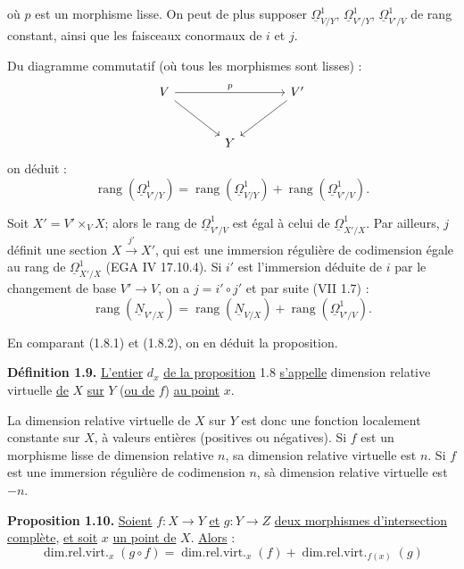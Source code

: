
où $p$ est un
morphisme lisse. On peut de plus supposer $\underline{\Omega}^1_{V/Y}$, $\underline{\Omega}^1_{V'/Y}$, $\underline{\Omega}^1_{V'/V}$ de rang constant, ainsi que les faisceaux conormaux de $i$ et $j$.

Du diagramme commutatif (où tous les morphismes sont lisses) :
\[
\begin{tikzcd}[column sep=large,row sep=large]
V \arrow[rr,"p"] \arrow[dr] && V' \arrow[dl]\\
& Y &
\end{tikzcd}
\]
on déduit :
\begin{equation}\tag{1.8.1}
\operatorname{rang}(\underline{\Omega}^1_{V'/Y})=
\operatorname{rang}(\underline{\Omega}^1_{V/Y})+
\operatorname{rang}(\underline{\Omega}^1_{V'/V}).
\end{equation}

Soit $X'=V'\times_V X$; alors le rang de $\underline{\Omega}^1_{V'/V}$ est égal à celui de $\underline{\Omega}^1_{X'/X}$. Par ailleurs, $j$ définit une section $X\xrightarrow{j'} X'$, qui est une immersion régulière de codimension égale au rang de $\underline{\Omega}^1_{X'/X}$ (EGA IV 17.10.4). Si $i'$ est l'immersion déduite de $i$ par le changement de base $V'\to V$, on a $j=i'\circ j'$ et par suite (VII 1.7) :
\begin{equation}\tag{1.8.2}
\operatorname{rang}(\underline{N}_{V'/X})=
\operatorname{rang}(\underline{N}_{V/X})+
\operatorname{rang}(\underline{\Omega}^1_{V'/V}).
\end{equation}

En comparant (1.8.1) et (1.8.2), on en déduit la proposition.

\textbf{Définition 1.9.} \uline{L'entier} $d_x$ \uline{de la proposition} 1.8 \uline{s'appelle} dimension relative virtuelle \uline{de} $X$ \uline{sur} $Y$ (\uline{ou de} $f$) \uline{au point} $x$.

La dimension relative virtuelle de $X$ sur $Y$ est donc une fonction localement constante sur $X$, à valeurs entières (positives ou négatives). Si $f$ est un morphisme lisse de dimension relative $n$, sa dimension relative virtuelle est $n$. Si $f$ est une immersion régulière de codimension $n$, sà dimension relative virtuelle est $-n$.

\textbf{Proposition 1.10.} \uline{Soient} $f:X\to Y$ \uline{et} $g:Y\to Z$ \uline{deux morphismes d'intersection complète}, \uline{et soit} $x$ \uline{un point de} $X$. \uline{Alors} :
\[
\operatorname{dim.rel.virt.}_x(g\circ f)=
\operatorname{dim.rel.virt.}_x(f)+
\operatorname{dim.rel.virt.}_{f(x)}(g)
\]
